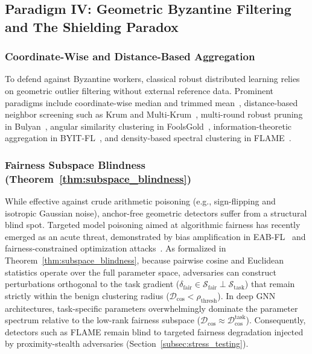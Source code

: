 \subsection{Paradigm IV: Geometric Byzantine Filtering and The Shielding Paradox}
\label{subsec:rw_paradigm_4}

\subsubsection{Coordinate-Wise and Distance-Based Aggregation}
To defend against Byzantine workers, classical robust distributed learning relies on geometric outlier filtering without external reference data. Prominent paradigms include coordinate-wise median and trimmed mean~\citep{yin2018byzantine}, distance-based neighbor screening such as Krum and Multi-Krum~\citep{blanchard2017krum}, multi-round robust pruning in Bulyan~\citep{mhamdi2018hidden}, angular similarity clustering in FoolsGold~\citep{fung2018mitigating}, information-theoretic aggregation in BYIT-FL~\citep{byitfl2024}, and density-based spectral clustering in FLAME~\citep{nguyen2022flame}.

\subsubsection{Fairness Subspace Blindness (Theorem~\ref{thm:subspace_blindness})}
While effective against crude arithmetic poisoning (e.g., sign-flipping and isotropic Gaussian noise), anchor-free geometric detectors suffer from a structural blind spot. Targeted model poisoning aimed at algorithmic fairness has recently emerged as an acute threat, demonstrated by bias amplification in EAB-FL~\citep{eabfl2024} and fairness-constrained optimization attacks~\citep{kasyap2025attack}. As formalized in Theorem~\ref{thm:subspace_blindness}, because pairwise cosine and Euclidean statistics operate over the full parameter space, adversaries can construct perturbations orthogonal to the task gradient ($\delta_{\mathrm{fair}} \in \mathcal{S}_{\mathrm{fair}} \perp \mathcal{S}_{\mathrm{task}}$) that remain strictly within the benign clustering radius ($\mathcal{D}_{\mathrm{cos}} < \rho_{\mathrm{thresh}}$). In deep GNN architectures, task-specific parameters overwhelmingly dominate the parameter spectrum relative to the low-rank fairness subspace ($\mathcal{D}_{\mathrm{cos}} \approx \mathcal{D}_{\mathrm{cos}}^{\mathrm{task}}$). Consequently, detectors such as FLAME remain blind to targeted fairness degradation injected by proximity-stealth adversaries (Section~\ref{subsec:stress_testing}).

